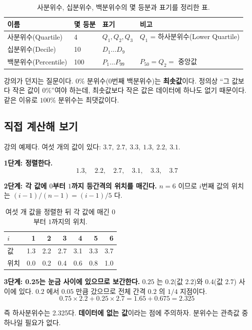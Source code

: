 \begin{table}[H]\centering
\caption{사분위수, 십분위수, 백분위수의 몇 등분과 표기를 정리한 표.}
\label{tab:viz-quantile-names}
\begin{tabularx}{\linewidth}{@{}l l l X@{}}
\toprule
이름 & 몇 등분 & 표기 & 비고 \\
\midrule
사분위수(Quartile) & 4 & $Q_1, Q_2, Q_3$ & $Q_1$ = 하사분위수(Lower Quartile) \\
\midrule
십분위수(Decile) & 10 & $D_1 \dots D_9$ & \\
\midrule
백분위수(Percentile) & 100 & $P_1 \dots P_{99}$ & $P_{50} = Q_2 = $ 중앙값 \\
\bottomrule
\end{tabularx}
\end{table}

\begin{pitfall}
강의가 던지는 질문이다. $0\%$ 분위수(0번째 백분위수)는 \textbf{최솟값}이다.
정의상 ``그 값보다 작은 값이 $0\%$''여야 하는데, 최솟값보다 작은 값은 데이터에
하나도 없기 때문이다. 같은 이유로 $100\%$ 분위수는 최댓값이다.
\end{pitfall}

\subsection{직접 계산해 보기}
\label{subsec:quantile-calc}

\begin{example}
\label{ex:quantile}
강의 예제다. 여섯 개의 값이 있다: $3.7,\ 2.7,\ 3.3,\ 1.3,\ 2.2,\ 3.1$.

\textbf{1단계: 정렬한다.}
\[
  1.3,\quad 2.2,\quad 2.7,\quad 3.1,\quad 3.3,\quad 3.7
\]

\textbf{2단계: 각 값에 $0$부터 $1$까지 등간격의 위치를 매긴다.}
$n = 6$ 이므로 $i$번째 값의 위치는 $(i-1)/(n-1) = (i-1)/5$ 다.

\begin{table}[H]\centering
\caption{여섯 개 값을 정렬한 뒤 각 값에 매긴 $0$부터 $1$까지의 위치.}
\label{tab:viz-quantile-position}
\begin{tabular}{@{}lrrrrrr@{}}
\toprule
$i$ & 1 & 2 & 3 & 4 & 5 & 6 \\
\midrule
값 & 1.3 & 2.2 & 2.7 & 3.1 & 3.3 & 3.7 \\
\midrule
위치 & 0.0 & 0.2 & 0.4 & 0.6 & 0.8 & 1.0 \\
\bottomrule
\end{tabular}
\end{table}

\textbf{3단계: 0.25는 눈금 사이에 있으므로 보간한다.}
$0.25$ 는 $0.2$(값 2.2)와 $0.4$(값 2.7) 사이에 있다. $0.2$ 에서
$0.05$ 만큼 갔으므로 전체 간격 $0.2$ 의 $1/4$ 지점이다.
\[
  0.75 \times 2.2 + 0.25 \times 2.7 = 1.65 + 0.675 = \mathbf{2.325}
\]

즉 하사분위수는 2.325다. \textbf{데이터에 없는 값}이라는 점에 주의하자.
분위수는 관측값 중 하나일 필요가 없다.
\end{example}

